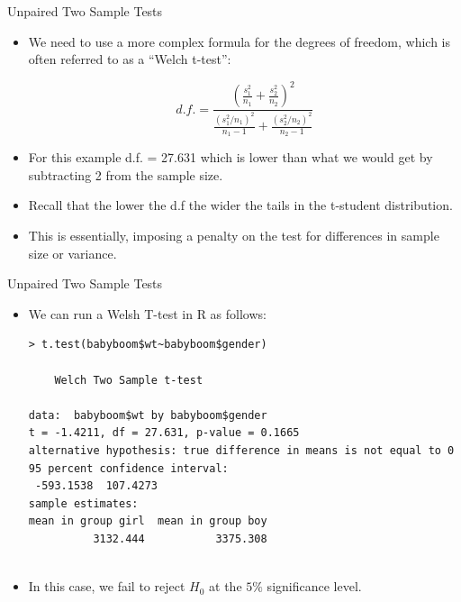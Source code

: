 \documentclass[handout]{beamer}
\begin{document}
\begin{frame}{Unpaired Two Sample Tests}
 \scriptsize{

\begin{itemize}
 
 \item We need to use a more complex formula for the degrees of freedom, which is often referred to as a ``Welch t-test'':
 
 \begin{displaymath}
  d.f. = \frac{\left(\frac{s_1^{2}}{n_1} + \frac{s_2^{2}}{n_2}\right)^2}{\frac{(s_1^2/n_1)^2}{n_1-1}+\frac{(s_2^2/n_2)^2}{n_2-1}}
 \end{displaymath}

 
 
 \item For this example d.f. = 27.631 which is lower than what we would get by subtracting 2 from the sample size.
  
 
 \item Recall that the lower the d.f the wider the tails in the t-student distribution.
 
 \item This is essentially, imposing a penalty on the test for differences in sample size or variance.
 

 
 
\end{itemize}



}
\end{frame}

\begin{frame}[fragile]{Unpaired Two Sample Tests}
 \scriptsize{

\begin{itemize}
 
 \item We can run a Welsh T-test in R as follows:
 
 \begin{verbatim}
> t.test(babyboom$wt~babyboom$gender)

	Welch Two Sample t-test

data:  babyboom$wt by babyboom$gender
t = -1.4211, df = 27.631, p-value = 0.1665
alternative hypothesis: true difference in means is not equal to 0
95 percent confidence interval:
 -593.1538  107.4273
sample estimates:
mean in group girl  mean in group boy 
          3132.444           3375.308 
  
 \end{verbatim}

 
\item In this case, we fail to reject $H_0$ at the $5\%$ significance level.
 
 
\end{itemize}



}
\end{frame}
\end{document}
